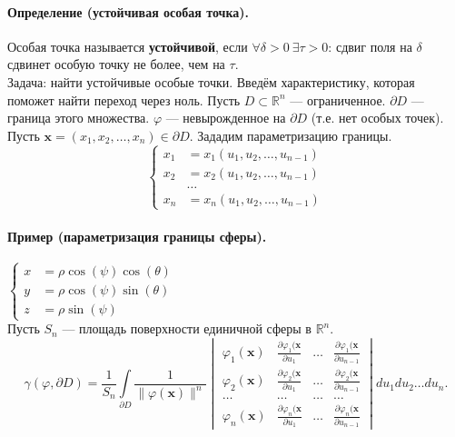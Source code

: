 \paragraph{Определение (устойчивая особая точка).} Особая точка называется \textbf{устойчивой}, если $\forall \delta > 0 \ \exists \tau > 0$: сдвиг поля на $\delta$ сдвинет особую точку не более, чем на $\tau$.
\\

Задача: найти устойчивые особые точки.
Введём характеристику, которая поможет найти переход через ноль.
Пусть $D \subset \mathbb{R}^n$ --- ограниченное. $\partial D$ --- граница этого множества. $\varphi$ --- невырожденное на $\partial D$ (т.е. нет особых точек).
Пусть $\mathbf{x}=(x_1,x_2,\hdots,x_n) \in \partial D$. Зададим параметризацию границы.
\[
	\left\{
	\begin{aligned}
		x_1 & = x_1(u_1, u_2, \dots, u_{n-1}) \\
		x_2 & = x_2(u_1, u_2, \dots, u_{n-1}) \\
		    & \hdots                          \\
		x_n & = x_n(u_1, u_2, \dots, u_{n-1}) 
	\end{aligned}
	\right.
\]
\paragraph{Пример (параметризация границы сферы).} $\left\{
\begin{aligned}
	x & = \rho \cos(\psi) \cos(\theta) \\
	y & = \rho \cos(\psi) \sin(\theta) \\
	z & = \rho \sin(\psi)              
\end{aligned}
\right.$
\\

Пусть $S_n$ --- площадь поверхности единичной сферы в $\mathbb{R}^n$.
\[
	\gamma(\varphi, \partial D) = \frac{1}{S_n} \int\limits_{\partial D} \frac{1}{\|\varphi(\mathbf{x})\|^n} \begin{vmatrix} \varphi_1(\mathbf{x}) & \frac{\partial \varphi_1(\mathbf{x}}{\partial u_1}  &\hdots & \frac{\partial \varphi_1(\mathbf{x}}{\partial u_{n-1}} \\ \varphi_2(\mathbf{x}) & \frac{\partial \varphi_2(\mathbf{x}}{\partial u_1}  &\hdots & \frac{\partial \varphi_2(\mathbf{x}}{\partial u_{n-1}} \\ \hdots & \hdots & \hdots & \hdots \\ \varphi_n(\mathbf{x}) & \frac{\partial \varphi_n(\mathbf{x}}{\partial u_1}  &\hdots & \frac{\partial \varphi_n(\mathbf{x}}{\partial u_{n-1}} \end{vmatrix} du_1du_2\hdots du_n.
\]
